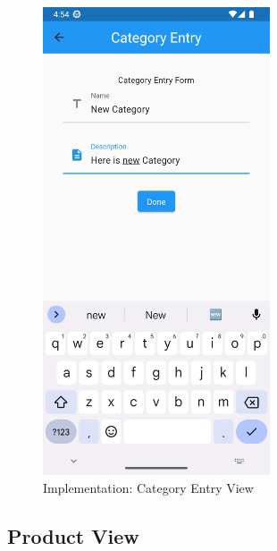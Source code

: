 \documentclass[../thesis.tex]{subfiles}
\begin{document}
\begin{figure}[H]
    \centering
    \includegraphics[width=0.60\textwidth]{images/CategoryScreen_EntryFom.png}
    \caption{Implementation: Category Entry View}
    \label{fig:CategoryScreen_EntryFom}
\end{figure}

\subsection{Product View}
\end{document}
